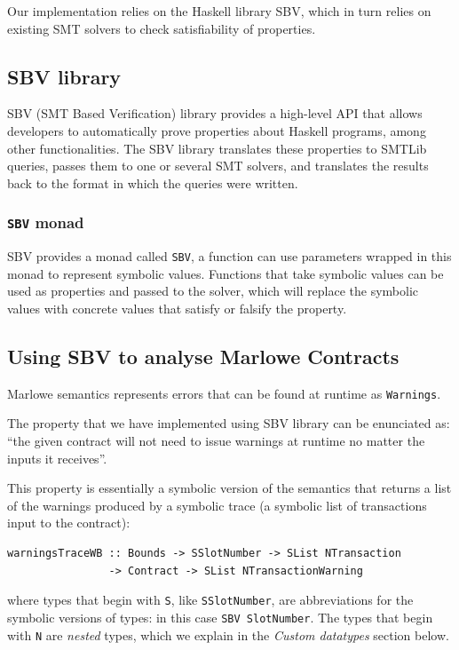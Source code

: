 \documentclass[runningheads]{llncs}
\begin{document}
Our implementation relies on the Haskell library SBV, which in turn relies on existing SMT solvers to check satisfiability of properties.

\subsection{SBV library}

SBV \cite{SBV} (SMT Based Verification) library provides a high-level API that allows developers to automatically prove properties about Haskell programs, among other functionalities.
The SBV library translates these properties to SMTLib queries, passes them to one or several SMT solvers, and translates the results back to the format in which the queries were written.

\subsubsection{\texttt{SBV} monad}

SBV provides a monad called \texttt{SBV}, a function can use parameters wrapped in this monad to represent symbolic values. Functions that take symbolic values can be used as properties and passed to the solver, which will replace the symbolic values with concrete values that satisfy or falsify the property.

\subsection{Using SBV to analyse Marlowe Contracts}

Marlowe semantics represents errors that can be found at runtime as \texttt{Warnings}.

The property that we have implemented using SBV library can be enunciated as: ``the given contract will not need to issue warnings at runtime no matter the inputs it receives''.

This property is essentially a symbolic version of the semantics that returns a list of the warnings produced by a symbolic trace (a symbolic list of transactions input to the contract):

\begin{verbatim}
warningsTraceWB :: Bounds -> SSlotNumber -> SList NTransaction
                -> Contract -> SList NTransactionWarning
\end{verbatim}

\noindent
where types that begin with \texttt{S}, like \texttt{SSlotNumber}, are abbreviations for the symbolic versions of types: in this case \texttt{SBV SlotNumber}.
The types that begin with \texttt{N} are \textit{nested} types, which we explain in the \textit{Custom datatypes} section below.
\end{document}
